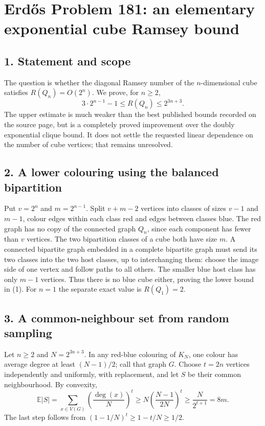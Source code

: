 \section*{Erd\H{o}s Problem 181: an elementary exponential cube Ramsey bound}

\subsection*{1. Statement and scope}
The question is whether the diagonal Ramsey number of the $n$-dimensional cube satisfies $R(Q_n)=O(2^n)$. We prove, for $n\ge2$,
\[
 3\cdot2^{n-1}-1\le R(Q_n)\le2^{3n+3}.\tag{1}
\]
The upper estimate is much weaker than the best published bounds recorded on the source page, but is a completely proved improvement over the doubly exponential clique bound. It does not settle the requested linear dependence on the number of cube vertices; that remains unresolved.

\subsection*{2. A lower colouring using the balanced bipartition}
Put $v=2^n$ and $m=2^{n-1}$. Split $v+m-2$ vertices into classes of sizes $v-1$ and $m-1$, colour edges within each class red and edges between classes blue. The red graph has no copy of the connected graph $Q_n$, since each component has fewer than $v$ vertices.
The two bipartition classes of a cube both have size $m$. A connected bipartite graph embedded in a complete bipartite graph must send its two classes into the two host classes, up to interchanging them: choose the image side of one vertex and follow paths to all others. The smaller blue host class has only $m-1$ vertices. Thus there is no blue cube either, proving the lower bound in (1). For $n=1$ the separate exact value is $R(Q_1)=2$.

\subsection*{3. A common-neighbour set from random sampling}
Let $n\ge2$ and $N=2^{3n+3}$. In any red-blue colouring of $K_N$, one colour has average degree at least $(N-1)/2$; call that graph $G$. Choose $t=2n$ vertices independently and uniformly, with replacement, and let $S$ be their common neighbourhood. By convexity,
\[
 \mathbb E|S|=\sum_{x\in V(G)}\left(\frac{\deg(x)}N\right)^t
 \ge N\left(\frac{N-1}{2N}\right)^t
 \ge \frac{N}{2^{t+1}}=8m.\tag{2}
\]
The last step follows from $(1-1/N)^t\ge1-t/N\ge1/2$.

